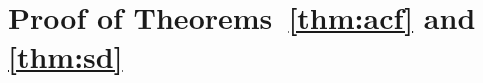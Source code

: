 \documentclass[ecta,nameyear,draft]{econsocart}
\newcommand{\1}{\mathbf 1}
\numberwithin{equation}{section}
\begin{document}
\begin{appendix}
\begin{equation}
\end{equation}

\section{Proof of Theorems~\ref{thm:acf} and \ref{thm:sd}}
\label{sec:outline_proof}


\end{appendix}
\end{document}
